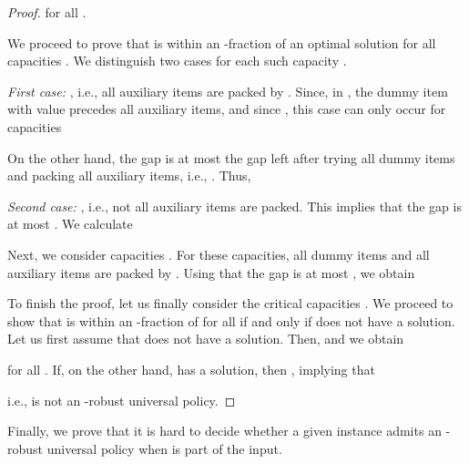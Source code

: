 \documentclass[11pt]{article}
\begin{document}
\begin{proof}
for all .

We proceed to prove that  is within an -fraction of an optimal
solution for all capacities . We distinguish
two cases for each such capacity .

\emph{First case:} , i.e., all auxiliary
items are packed by . Since, in , the dummy item 
with value  precedes all auxiliary items, and since ,
this case can only occur for capacities

On the other hand, the gap  is at most the gap left
after trying all dummy items and packing all auxiliary items, i.e.,
.
Thus,



\emph{Second case: },
i.e., not all auxiliary items are packed. This implies that the gap
 is at most . We calculate



Next, we consider capacities .
For these capacities, all dummy items and all auxiliary items are
packed by . Using that the gap  is at most ,
we obtain



To finish the proof, let us finally consider the critical capacities
. We proceed to show that 
is within an -fraction of  for all 
if and only if  does not have a solution. Let us first assume
that  does not have a solution. Then, 
and we obtain

for all . If, on the other
hand,  has a solution, then , implying that 


i.e.,  is not an -robust universal policy.
\end{proof}

Finally, we prove that it is hard to decide whether a given instance
admits an -robust universal policy when  is part
of the input.
\end{document}
